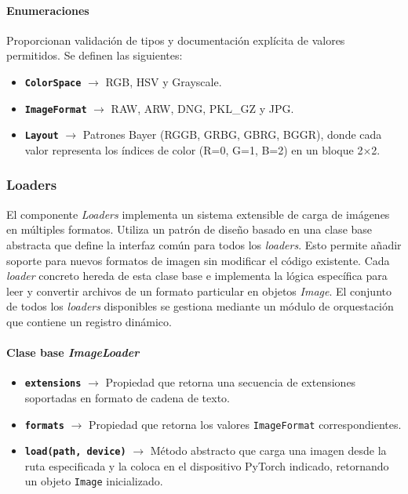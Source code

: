 \paragraph{Enumeraciones} \label{par:7_3_1_4_enumeraciones}
Proporcionan validación de tipos y documentación explícita de valores permitidos. Se definen las 
siguientes:

\begin{itemize}[noitemsep]
    \item \texttt{\textbf{ColorSpace}} $\rightarrow$ RGB, HSV y Grayscale.
    \item \texttt{\textbf{ImageFormat}} $\rightarrow$ RAW, ARW, DNG, PKL\_GZ y JPG.
    \item \texttt{\textbf{Layout}} $\rightarrow$ Patrones Bayer (RGGB, GRBG, GBRG, BGGR), donde cada valor 
    representa los índices de color (R=0, G=1, B=2) en un bloque 2×2.
\end{itemize}

\newpage

\subsubsection{Loaders} \label{subsubsec:7_3_2_loaders}
El componente \textit{Loaders} implementa un sistema extensible de carga de imágenes en múltiples 
formatos. Utiliza un patrón de diseño basado en una clase base abstracta \cite{python_abc} que define la interfaz 
común para todos los \textit{loaders}. Esto permite añadir soporte para nuevos formatos de imagen 
sin modificar el código existente. Cada \textit{loader} concreto hereda de esta clase base e implementa la lógica
específica para leer y convertir archivos de un formato particular en objetos \textit{Image}. 
El conjunto de todos los \textit{loaders} disponibles se gestiona mediante un módulo de orquestación 
que contiene un registro dinámico. 

\paragraph{Clase base \textit{ImageLoader}} \label{par:7_3_2_1_image_loader}

\begin{itemize}[noitemsep]
    \item \texttt{\textbf{extensions}} $\rightarrow$ Propiedad que retorna una secuencia de extensiones soportadas 
    en formato de cadena de texto.
    \item \texttt{\textbf{formats}} $\rightarrow$ Propiedad que retorna los valores \texttt{ImageFormat} 
    correspondientes.
    \item \texttt{\textbf{load(path, device)}} $\rightarrow$ Método abstracto que carga una imagen desde la ruta 
    especificada y la coloca en el dispositivo PyTorch indicado, retornando un objeto 
    \texttt{Image} inicializado.
\end{itemize}

